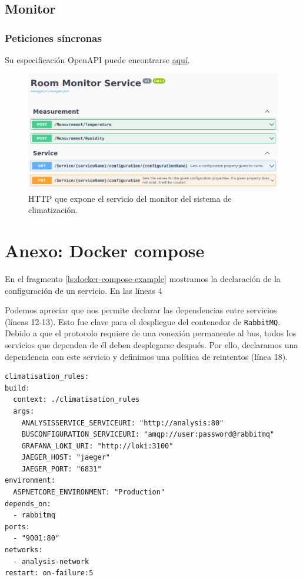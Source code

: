 \subsection{Monitor}

\subsubsection{Peticiones síncronas}

Su especificación OpenAPI puede encontrarse \href{https://github.com/Starkie/TFM-DistributedAutoadaptiveSystems/blob/1db95346290cb55edbfd5efb717785bcd06def79/src/AutoAdaptativeSystem/Climatisation/Monitor/Climatisation.Monitor.Service-OpenAPISpec.json}{aquí}.

\begin{figure}[h!]
  \hspace{-0.25cm}
  \includegraphics[scale=0.45]{anx_apis/images/apis-room-monitor}
  \caption{ HTTP que expone el servicio del monitor del sistema de climatización.}
\end{figure}

\pagebreak

\section{Anexo: Docker compose}

En el fragmento \ref{ls:docker-compose-example} mostramos la declaración de la configuración de un servicio. En las líneas 4

Podemos apreciar que nos permite declarar las dependencias entre servicios (líneas 12-13). Esto fue clave para el despliegue del contenedor de \texttt{RabbitMQ}. Debido a que el protocolo requiere de una conexión permanente al bus\cite{johanssonPartRabbitMQBest2019}, todos los servicios que dependen de él deben desplegarse después. Por ello, declaramos una dependencia con este servicio y definimos una política de reintentos (línea 18).

\begin{lstlisting}[style=yaml,caption={Ejemplo de declaración de despliegue de un servicio en Docker Compose},captionpos=b, label=ls:docker-compose-example]
climatisation_rules:
build:
  context: ./climatisation_rules
  args:
    ANALYSISSERVICE_SERVICEURI: "http://analysis:80"
    BUSCONFIGURATION_SERVICEURI: "amqp://user:password@rabbitmq"
    GRAFANA_LOKI_URI: "http://loki:3100"
    JAEGER_HOST: "jaeger"
    JAEGER_PORT: "6831"
environment:
  ASPNETCORE_ENVIRONMENT: "Production"
depends_on:
  - rabbitmq
ports:
  - "9001:80"
networks:
  - analysis-network
restart: on-failure:5
  \end{lstlisting}
